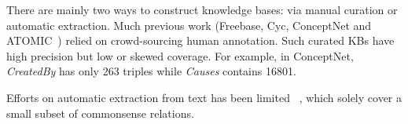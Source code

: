 \documentclass[11pt,a4paper]{article}
\newcommand{\KZ}[1]{\textcolor{blue}{Kenny: #1}}
\begin{document}

There are mainly two ways to construct knowledge bases: 
via manual curation or automatic extraction. Much previous work (Freebase, Cyc, 
ConceptNet and ATOMIC~\cite{sap2019atomic}) relied on crowd-sourcing human annotation. 
Such curated KBs have high precision but low or skewed coverage. 
For example, in ConceptNet, \textit{CreatedBy} has only 263 triples 
while \textit{Causes} contains 16801.  

Efforts on automatic extraction from text has been limited ~\cite{yatskar2016stating,tandon2016commonsense,tandon2017webchild,xu2017automatic}, which solely cover a small subset of commonsense relations.





\end{document}
